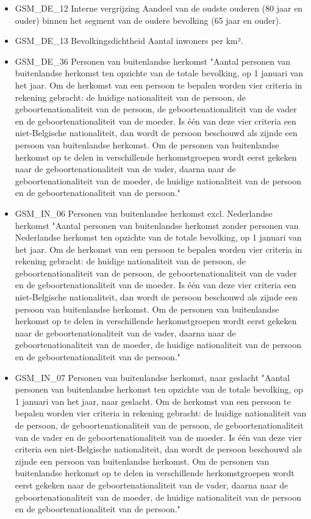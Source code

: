 \documentclass{SVnote}
\begin{document}
\begin{itemize}
\item GSM\_DE\_12	Interne vergrijzing		Aandeel van de oudste ouderen (80 jaar en ouder) binnen het segment van de oudere bevolking (65 jaar en ouder).
\item GSM\_DE\_13	Bevolkingsdichtheid		Aantal inwoners per km².
\item GSM\_DE\_36	Personen van buitenlandse herkomst		"Aantal personen van buitenlandse herkomst ten opzichte van de totale bevolking, op 1 januari van het jaar.
Om de herkomst van een persoon te bepalen worden vier criteria in rekening gebracht: de huidige nationaliteit van de persoon, de geboortenationaliteit van de persoon, de geboortenationaliteit van de vader en de geboortenationaliteit van de moeder. Is één van deze vier criteria een niet-Belgische nationaliteit, dan wordt de persoon beschouwd als zijnde een persoon van buitenlandse herkomst. Om de personen van buitenlandse herkomst op te delen in verschillende herkomstgroepen wordt eerst gekeken naar de geboortenationaliteit van de vader, daarna naar de geboortenationaliteit van de moeder, de huidige nationaliteit van de persoon en de geboortenationaliteit van de persoon."
\item GSM\_IN\_06	Personen van buitenlandse herkomst excl. Nederlandse herkomst		"Aantal personen van buitenlandse herkomst zonder personen van Nederlandse herkomst ten opzichte van de totale bevolking, op 1 januari van het jaar.
Om de herkomst van een persoon te bepalen worden vier criteria in rekening gebracht: de huidige nationaliteit van de persoon, de geboortenationaliteit van de persoon, de geboortenationaliteit van de vader en de geboortenationaliteit van de moeder. Is één van deze vier criteria een niet-Belgische nationaliteit, dan wordt de persoon beschouwd als zijnde een persoon van buitenlandse herkomst. Om de personen van buitenlandse herkomst op te delen in verschillende herkomstgroepen wordt eerst gekeken naar de geboortenationaliteit van de vader, daarna naar de geboortenationaliteit van de moeder, de huidige nationaliteit van de persoon en de geboortenationaliteit van de persoon."
\item GSM\_IN\_07	Personen van buitenlandse herkomst, naar geslacht		"Aantal personen van buitenlandse herkomst ten opzichte van de totale bevolking, op 1 januari van het jaar, naar geslacht.
Om de herkomst van een persoon te bepalen worden vier criteria in rekening gebracht: de huidige nationaliteit van de persoon, de geboortenationaliteit van de persoon, de geboortenationaliteit van de vader en de geboortenationaliteit van de moeder. Is één van deze vier criteria een niet-Belgische nationaliteit, dan wordt de persoon beschouwd als zijnde een persoon van buitenlandse herkomst. Om de personen van buitenlandse herkomst op te delen in verschillende herkomstgroepen wordt eerst gekeken naar de geboortenationaliteit van de vader, daarna naar de geboortenationaliteit van de moeder, de huidige nationaliteit van de persoon en de geboortenationaliteit van de persoon."

\end{itemize}
\end{document}
